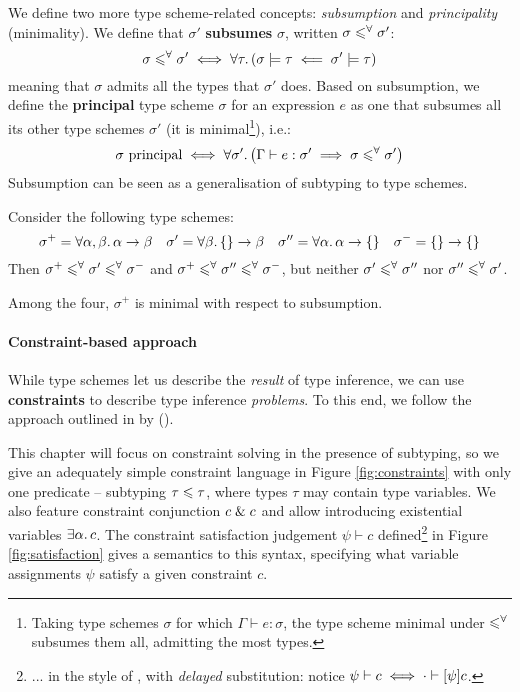 We define two more type scheme-related concepts: \emph{subsumption} and \emph{principality} (minimality). We define that $\sigma'$ \textbf{subsumes} $\sigma$, written $\sigma \leqslant^\forall \sigma'$:
$$ \sigma \leqslant^\forall \sigma' \iff \forall \tau \ldotp (\sigma \models \tau \impliedby \sigma' \models \tau) $$
meaning that $\sigma$ admits all the types that $\sigma'$ does.
Based on subsumption, we define the \textbf{principal} type scheme $\sigma$ for an expression $e$ as one that subsumes all its other type schemes $\sigma'$ (it is minimal\footnote{Taking type schemes $\sigma$ for which $\Gamma \vdash e : \sigma$, the type scheme minimal under $\leqslant^\forall$ subsumes them all, admitting the most types.}), i.e.\@:
$$ \sigma\text{ principal} \iff \forall \sigma' \ldotp \left( \Gamma \vdash e : \sigma' \implies \sigma \subsume \sigma' \right) $$
Subsumption can be seen as a generalisation of subtyping to type schemes.
\begin{example}
Consider the following type schemes:
$$    \sigma^+ = \forall \alpha, \beta \ldotp \alpha \to \beta
\quad \sigma' = \forall \beta \ldotp \flrec{} \to \beta 
\quad \sigma'' = \forall \alpha \ldotp \alpha \to \flrec{} 
\quad \sigma^- = \flrec{} \to \flrec{} $$
Then $\sigma^+ \leqslant^\forall \sigma' \leqslant^\forall \sigma^-$ and $\sigma^+ \leqslant^\forall \sigma'' \leqslant^\forall \sigma^-$, but neither $\sigma' \leqslant^\forall \sigma''$ nor $\sigma'' \leqslant^\forall \sigma'$. 

Among the four, $\sigma^+$ is minimal with respect to subsumption.
\end{example}

\paragraph{Constraint-based approach} While type schemes let us describe the \emph{result} of type inference, we can use \textbf{constraints} to describe type inference \emph{problems}. To this end, we follow the approach outlined in  by \textcite{essence-of-ml-type-inference} (\textcite[Chapter~10]{adv-tapl}).

This chapter will focus on constraint solving in the presence of subtyping, so we give an adequately simple constraint language in Figure \ref{fig:constraints} with only one predicate -- subtyping $\tau \leqslant \tau$, where types $\tau$ may contain type variables. We also feature constraint conjunction $c \;\&\; c$ and allow introducing existential variables $\exists \alpha \ldotp c$. The constraint satisfaction judgement $\psi \vdash c$ defined\footnote{... in the style of \textcite{constraint-based-freeze-ml}, with \emph{delayed} substitution: notice $\psi \vdash c \iff \cdot \vdash \substx \psi c$.} in Figure \ref{fig:satisfaction} gives a semantics to this syntax, specifying what variable assignments $\psi$ satisfy a given constraint $c$. 

